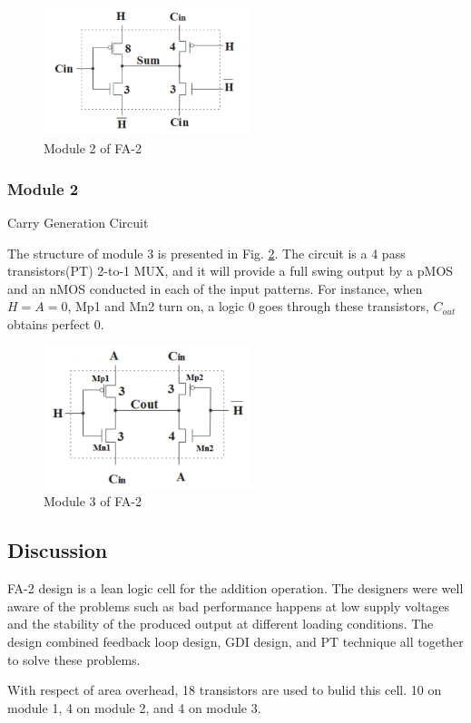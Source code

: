 \documentclass[conference]{IEEEtran}
\begin{document}
\begin{figure}[!hb]
	\centering
	\includegraphics[width=2.4in]{fa2-m2.png}
	\caption{Module 2 of FA-2}
	\label{fig:fa2-m2}
\end{figure}

\subsubsection{Module 2} Carry Generation Circuit

The structure of module 3 is presented in Fig. \ref{fig:fa2-m3}.
The circuit is a 4 pass transistors(PT) 2-to-1 MUX, and it will provide a full swing output by a pMOS and an nMOS conducted in each of the input patterns.
For instance, when \(H = A = 0\), Mp1 and Mn2 turn on, a logic 0 goes through these transistors, \(C_{out}\) obtains perfect 0.

\begin{figure}[!hb]
	\centering
	\includegraphics[width=2.4in]{fa2-m3.png}
	\caption{Module 3 of FA-2}
	\label{fig:fa2-m3}
\end{figure}

\subsection{Discussion}

FA-2 design is a lean logic cell for the addition operation.
The designers were well aware of the problems such as bad performance happens at low supply voltages
and the stability of the produced output at different loading conditions.
The design combined feedback loop design, GDI design, and PT technique all together to solve these problems.

With respect of area overhead, 18 transistors are used to bulid this cell. 10 on module 1, 4 on module 2, and 4 on module 3.
\end{document}
